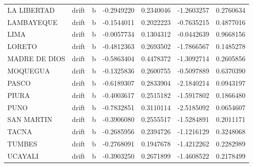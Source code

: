 \documentclass[
]{article}
\begin{document}
\begin{table}[!h]
\begin{tabular}[t]{lllrrrr}
LA LIBERTAD & drift & b & -0.2949220 & 0.2340046 & -1.2603257 & 0.2760634\\
LAMBAYEQUE & drift & b & -0.1544011 & 0.2022223 & -0.7635215 & 0.4877016\\
LIMA & drift & b & -0.0057734 & 0.1304312 & -0.0442639 & 0.9668156\\
LORETO & drift & b & -0.4812363 & 0.2693502 & -1.7866567 & 0.1485278\\
\addlinespace
MADRE DE DIOS & drift & b & -0.5863404 & 0.4478372 & -1.3092714 & 0.2605856\\
MOQUEGUA & drift & b & -0.1325836 & 0.2600755 & -0.5097889 & 0.6370390\\
PASCO & drift & b & -0.6189307 & 0.2833904 & -2.1840214 & 0.0943197\\
PIURA & drift & b & -0.4003617 & 0.2515182 & -1.5917802 & 0.1866480\\
PUNO & drift & b & -0.7832851 & 0.3110114 & -2.5185092 & 0.0654607\\
\addlinespace
SAN MARTIN & drift & b & -0.3906080 & 0.2555517 & -1.5284891 & 0.2011171\\
TACNA & drift & b & -0.2685956 & 0.2394726 & -1.1216129 & 0.3248068\\
TUMBES & drift & b & -0.2768091 & 0.1947678 & -1.4212262 & 0.2282989\\
UCAYALI & drift & b & -0.3903250 & 0.2671899 & -1.4608522 & 0.2178499\\
\bottomrule
\end{tabular}
\end{table}
\end{document}
